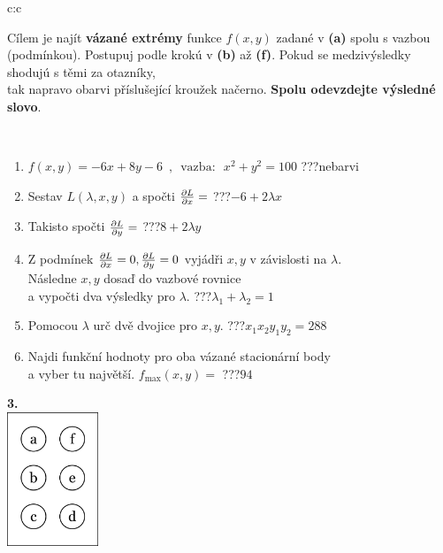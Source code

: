 \documentclass[10pt]{report}
\begin{document}
\begin{tabular}{c:c}
\begin{minipage}[c][104.5mm][t]{0.5\linewidth}
\begin{center}
\begin{minipage}{0.95\linewidth}
\begin{center}
Cílem je najít \textbf{vázané extrémy} funkce $f(x,y)$ zadané v \textbf{(a)} spolu s vazbou (podmínkou). Postupuj podle krokú v \textbf{(b)} až \textbf{(f)}. Pokud se medzivýsledky shodujú s těmi za otazníky,\\tak napravo obarvi příslušející kroužek načerno. \textbf{Spolu odevzdejte výsledné slovo}.
\end{center}
\end{minipage}
\\[1mm]
\begin{minipage}{0.79\linewidth}
\begin{center}
\begin{varwidth}{\linewidth}
\begin{enumerate}
\normalsize
\item $f(x,y)=-6x+8y-6 \enspace , \enspace \mathrm{vazba:} \enspace x^2+y^2=100$\quad \dotfill\; ???\;\dotfill \quad nebarvi
\item Sestav $L(\lambda,x,y)$ a spočti $\pdv{L}{x}=$\quad \dotfill\; ???\;\dotfill \quad $-6+2\lambda x$
\item Takisto spočti $\pdv{L}{y}=$\quad \dotfill\; ???\;\dotfill \quad $8+2\lambda y$
\item Z podmínek $\pdv{L}{x}=0 , \pdv{L}{y}=0$ vyjádři $x,y$ v závislosti na $\lambda$.\\ \phantom{xxxxxx}Následne $x,y$ dosaď do vazbové rovnice\\ \phantom{xxxxxx}a vypočti dva výsledky pro $\lambda$.\quad \dotfill\; ???\;\dotfill \quad $\lambda_1+\lambda_2=1$
\item Pomocou $\lambda$ urč dvě dvojice pro $x,y$.\quad \dotfill\; ???\;\dotfill \quad $x_1 x_2 y_1 y_2=288$
\item Najdi funkční hodnoty pro oba vázané stacionární body\\ \phantom{xxxxxx}a vyber tu najvětší. $f_{\text{max}}(x,y)=$\quad \dotfill\; ???\;\dotfill \quad $94$
\end{enumerate}
\end{varwidth}
\end{center}
\end{minipage}
\begin{minipage}{0.20\linewidth}
\begin{center}
{\Huge\bfseries 3.} \\[2mm]
\includegraphics[height=40mm]{../images/braille.png}

\end{center}
\end{minipage}
\end{center}
\end{minipage}
\end{tabular}
\end{document}
